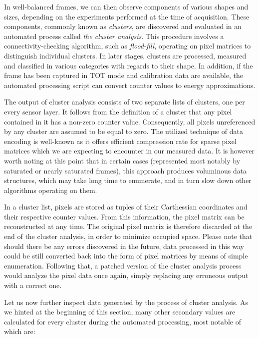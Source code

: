 In well-balanced frames, we can then observe components of various shapes and sizes, depending on the experiments performed at the time of acquisition. These components, commonly known as \textit{clusters}, are discovered and evaluated in an automated process called \textit{the cluster analysis}. This procedure involves a connectivity-checking algorithm, such as \textit{flood-fill}, operating on pixel matrices to distinguish individual clusters. In later stages, clusters are processed, measured and classified in various categories with regards to their shape. In addition, if the frame has been captured in TOT mode and calibration data are available, the automated processing script can convert counter values to energy approximations.


The output of cluster analysis consists of two separate lists of clusters, one per every sensor layer. It follows from the definition of a cluster that any pixel contained in it has a non-zero counter value. Consequently, all pixels unreferenced by any cluster are assumed to be equal to zero. The utilized technique of data encoding is well-known as it offers efficient compression rate for sparse pixel matrices which we are expecting to encounter in our measured data. It is however worth noting at this point that in certain cases (represented most notably by saturated or nearly saturated frames), this approach produces voluminous data structures, which may take long time to enumerate, and in turn slow down other algorithms operating on them.

In a cluster list, pixels are stored as tuples of their Carthessian coordinates and their respective counter values. From this information, the pixel matrix can be reconstructed at any time. The original pixel matrix is therefore discarded at the end of the cluster analysis, in order to minimize occupied space. Please note that should there be any errors discovered in the future, data processed in this way could be still converted back into the form of pixel matrices by means of simple enumeration. Following that, a patched version of the cluster analysis process would analyze the pixel data once again, simply replacing any erroneous output with a correct one.

Let us now further inspect data generated by the process of cluster analysis. As we hinted at the beginning of this section, many other secondary values are calculated for every cluster during the automated processing, most notable of which are:

